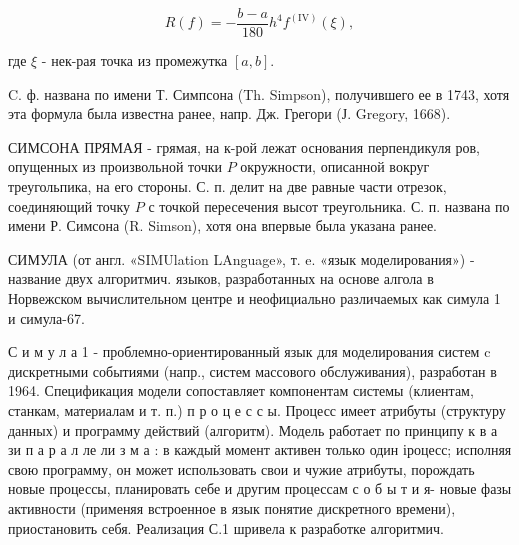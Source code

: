 \documentclass[10pt]{article}
\begin{document}
\[

R(f)=-\frac{b-a}{180} h^{4} f^{(\mathrm{IV})}(\xi),

\]



где $\xi$ - нек-рая точка из промежутка $[a, b]$.



C. ф. названа по имени Т. Симпсона (Th. Simpson), получившего ее в 1743, хотя эта формула была известна ранее, напр. Дж. Грегори (Ј. Gregory, 1668).



СИМСОНА ПРЯМАЯ - грямая, на к-рой лежат основания перпендикуля ров, опущенных из произвольной точки $P$ окружности, описанной вокруг треугольпика, на его стороны. С. п. делит на две равные части отрезок, соединяющий точку $P$ с точкой пересечения высот треугольника. С. п. названа по имени Р. Симсона (R. Simson), хотя она впервые была указана ранее.



СИМУЛА (от англ. «SIMUlation LAnguage», т. e. «язык моделирования») - название двух алгоритмич. языков, разработанных на основе алгола в Норвежском вычислительном центре и неофициально различаемых как симула 1 и симула-67.



С и м у л а 1 - проблемно-ориентированный язык для моделирования систем $\mathrm{c}$ дискретными событиями (напр., систем массового обслуживания), разработан в 1964. Спецификация модели сопоставляет компонентам системы (клиентам, станкам, материалам и т. п.) п р о ц е с с ы. Процесс имеет атрибуты (структуру данных) и программу действий (алгоритм). Модель работает по принципу к в а зи п а р а л ле ли з м а : в каждый момент активен только один іроцесс; исполняя свою программу, он может использовать свои и чужие атрибуты, порождать новые процессы, планировать себе и другим процессам с о б ы т и я- новые фазы активности (применяя встроенное в язык понятие дискретного времени), приостановить себя. Реализация С.1 шривела к разработке алгоритмич.
\end{document}
